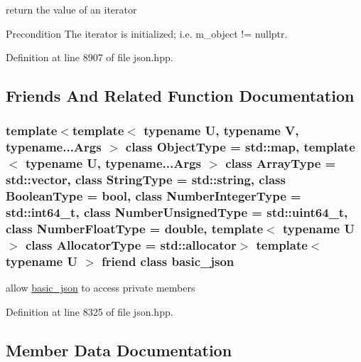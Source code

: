 return the value of an iterator 

\begin{DoxyPrecond}{Precondition}
The iterator is initialized; i.\+e. {\ttfamily m\+\_\+object != nullptr}. 
\end{DoxyPrecond}


Definition at line 8907 of file json.\+hpp.



\subsection{Friends And Related Function Documentation}
\hypertarget{classnlohmann_1_1basic__json_1_1iter__impl_ada3100cdb8700566051828f1355fa745}{}
\subsubsection[{basic\+\_\+json}]{\setlength{\rightskip}{0pt plus 5cm}template$<$template$<$ typename U, typename V, typename...\+Args $>$ class Object\+Type = std\+::map, template$<$ typename U, typename...\+Args $>$ class Array\+Type = std\+::vector, class String\+Type  = std\+::string, class Boolean\+Type  = bool, class Number\+Integer\+Type  = std\+::int64\+\_\+t, class Number\+Unsigned\+Type  = std\+::uint64\+\_\+t, class Number\+Float\+Type  = double, template$<$ typename U $>$ class Allocator\+Type = std\+::allocator$>$ template$<$typename U $>$ friend class {\bf basic\+\_\+json}\hspace{0.3cm}{\ttfamily [friend]}}\label{classnlohmann_1_1basic__json_1_1iter__impl_ada3100cdb8700566051828f1355fa745}


allow \hyperlink{classnlohmann_1_1basic__json}{basic\+\_\+json} to access private members 



Definition at line 8325 of file json.\+hpp.



\subsection{Member Data Documentation}
\hypertarget{classnlohmann_1_1basic__json_1_1iter__impl_a1c6303265483322388cbd033ddf53f72}{}
